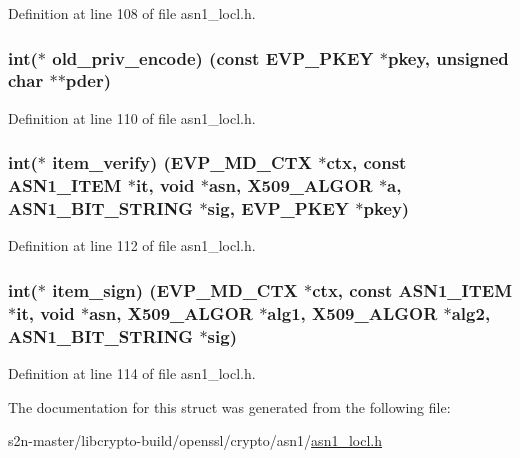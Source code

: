 Definition at line 108 of file asn1\+\_\+locl.\+h.

\subsubsection[{\texorpdfstring{old\+\_\+priv\+\_\+encode}{old_priv_encode}}]{\setlength{\rightskip}{0pt plus 5cm}int($\ast$ old\+\_\+priv\+\_\+encode) (const {\bf E\+V\+P\+\_\+\+P\+K\+EY} $\ast$pkey, unsigned char $\ast$$\ast$pder)}\hypertarget{structevp__pkey__asn1__method__st_adc29c006039e7021de8800d7e02a33ab}{}\label{structevp__pkey__asn1__method__st_adc29c006039e7021de8800d7e02a33ab}


Definition at line 110 of file asn1\+\_\+locl.\+h.

\subsubsection[{\texorpdfstring{item\+\_\+verify}{item_verify}}]{\setlength{\rightskip}{0pt plus 5cm}int($\ast$ item\+\_\+verify) ({\bf E\+V\+P\+\_\+\+M\+D\+\_\+\+C\+TX} $\ast$ctx, const {\bf A\+S\+N1\+\_\+\+I\+T\+EM} $\ast$it, {\bf void} $\ast$asn, {\bf X509\+\_\+\+A\+L\+G\+OR} $\ast${\bf a}, {\bf A\+S\+N1\+\_\+\+B\+I\+T\+\_\+\+S\+T\+R\+I\+NG} $\ast$sig, {\bf E\+V\+P\+\_\+\+P\+K\+EY} $\ast$pkey)}\hypertarget{structevp__pkey__asn1__method__st_a87a5c2c7f33eb62cf4fd033135517160}{}\label{structevp__pkey__asn1__method__st_a87a5c2c7f33eb62cf4fd033135517160}


Definition at line 112 of file asn1\+\_\+locl.\+h.

\subsubsection[{\texorpdfstring{item\+\_\+sign}{item_sign}}]{\setlength{\rightskip}{0pt plus 5cm}int($\ast$ item\+\_\+sign) ({\bf E\+V\+P\+\_\+\+M\+D\+\_\+\+C\+TX} $\ast$ctx, const {\bf A\+S\+N1\+\_\+\+I\+T\+EM} $\ast$it, {\bf void} $\ast$asn, {\bf X509\+\_\+\+A\+L\+G\+OR} $\ast$alg1, {\bf X509\+\_\+\+A\+L\+G\+OR} $\ast$alg2, {\bf A\+S\+N1\+\_\+\+B\+I\+T\+\_\+\+S\+T\+R\+I\+NG} $\ast$sig)}\hypertarget{structevp__pkey__asn1__method__st_a4dc2060517e5bdbc63f446c3bfefbda0}{}\label{structevp__pkey__asn1__method__st_a4dc2060517e5bdbc63f446c3bfefbda0}


Definition at line 114 of file asn1\+\_\+locl.\+h.



The documentation for this struct was generated from the following file\+:\begin{DoxyCompactItemize}
\item 
s2n-\/master/libcrypto-\/build/openssl/crypto/asn1/\hyperlink{asn1__locl_8h}{asn1\+\_\+locl.\+h}\end{DoxyCompactItemize}
